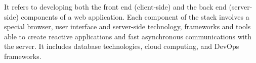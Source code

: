 It refers to developing both the front end (client-side) and the back end (server-side) components of a web application. Each component of the stack involves a special browser, user interface and server-side technology, frameworks and tools able to create reactive applications and fast asynchronous communications with the server. It includes database technologies, cloud computing, and DevOps frameworks.
